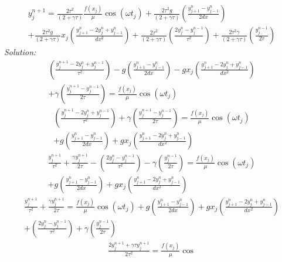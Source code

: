 \begin{enumerate}
\begin{enumerate}
\begin{multline}
  y_j^{n+1} = \frac{2\tau^2}{\left( 2 + \gamma \tau\right)} \frac{f(x_j)}{\mu}
  \cos (\omega t_j) + \frac{2\tau^2 g }{\left( 2 + \gamma
      \tau\right)} \left( \frac{y_{j+1}^n - y_{j-1}^n}{2 dx}\right)\\ +
  \frac{2\tau^2 g }{\left( 2 + \gamma \tau\right)} x_j\left(
    \frac{y_{j+1}^n - 2 y_j^n + y_{j-1}^n}{dx^2}\right) +
  \frac{2\tau^2}{\left( 2 + \gamma \tau\right)}\left(\frac{ 2
      y_j^n - y_j^{n-1}}{\tau^2}\right) +
  \frac{ 2\tau^2\gamma}{\left( 2 + \gamma \tau\right)} \left(
    \frac{ y_j^{n-1}}{2 \tau}\right) 
\end{multline}
\ifsolutions
\textit{Solution:}
\begin{multline}
  \left(\frac{y_j^{n+1} - 2 y_j^n + y_j^{n-1}}{\tau^2}\right) - g
  \left( \frac{y_{j+1}^n - y_{j-1}^n}{2 dx}\right) - g x_j\left(
    \frac{y_{j+1}^n - 2 y_j^n + y_{j-1}^n}{dx^2}\right)\\ + \gamma
  \left( \frac{y_j^{n+1} - y_j^{n-1}}{2 \tau}\right) = \frac{f(x_j)}{\mu} \cos
  (\omega t_j)
\end{multline}
\begin{multline}
\left(\frac{y_j^{n+1} - 2 y_j^n + y_j^{n-1}}{\tau^2}\right) +
  \gamma \left( \frac{y_j^{n+1} - y_j^{n-1}}{2 \tau}\right) = \frac{f(x_j)}{\mu}
  \cos (\omega t_j)\\ + g \left( \frac{y_{j+1}^n - y_{j-1}^n}{2
      dx}\right) + g x_j\left( \frac{y_{j+1}^n  - 2 y_j^n +
      y_{j-1}^n}{dx^2}\right) 
\end{multline}
\begin{multline}
  \frac{y_j^{n+1}}{\tau^2} + \frac{\gamma y_j^{n+1}}{2 \tau} -
  \left(\frac{ 2 y_j^n - y_j^{n-1}}{\tau^2}\right) - \gamma \left(
    \frac{ y_j^{n-1}}{2 \tau}\right) = \frac{f(x_j)}{\mu} \cos (\omega t_j)\\ + g
  \left( \frac{y_{j+1}^n - y_{j-1}^n}{2 dx}\right) + g
  x_j\left( \frac{y_{j+1}^n - 2 y_j^n +
      y_{j-1}^n}{dx^2}\right) 
\end{multline}
\begin{multline}
  \frac{ y_j^{n+1}}{\tau^2} + \frac{\gamma y_j^{n+1}}{2 \tau} =
  \frac{f(x_j)}{\mu} \cos (\omega t_j) + g \left( \frac{y_{j+1}^n -
      y_{j-1}^n}{2 dx}\right) + g x_j\left( \frac{y_{j+1}^n - 2
      y_j^n + y_{j-1}^n}{dx^2}\right)\\ + \left(\frac{ 2 y_j^n -
      y_j^{n-1}}{\tau^2}\right) +
  \gamma \left( \frac{ y_j^{n-1}}{2 \tau}\right) 
\end{multline}
\begin{multline}
  \frac{2 y_j^{n+1} + \gamma \tau y_j^{n+1}}{2\tau^2} = \frac{f(x_j)}{\mu} \cos

\end{multline}
\end{enumerate}
\end{enumerate}
